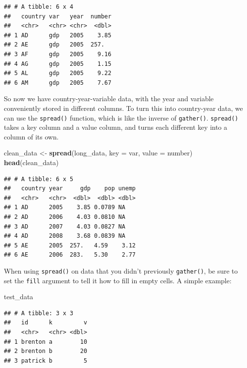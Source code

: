 \documentclass[12pt,oneside,openany]{book}
\newenvironment{Shaded}{\begin{snugshade}}{\end{snugshade}}
\newcommand{\KeywordTok}[1]{\textcolor[rgb]{0.13,0.29,0.53}{\textbf{#1}}}
\newcommand{\DataTypeTok}[1]{\textcolor[rgb]{0.13,0.29,0.53}{#1}}
\newcommand{\StringTok}[1]{\textcolor[rgb]{0.31,0.60,0.02}{#1}}
\newcommand{\NormalTok}[1]{#1}
\begin{document}
\begin{verbatim}
## # A tibble: 6 x 4
##   country var   year  number
##   <chr>   <chr> <chr>  <dbl>
## 1 AD      gdp   2005    3.85
## 2 AE      gdp   2005  257.  
## 3 AF      gdp   2005    9.16
## 4 AG      gdp   2005    1.15
## 5 AL      gdp   2005    9.22
## 6 AM      gdp   2005    7.67
\end{verbatim}

So now we have country-year-variable data, with the year and variable
conveniently stored in different columns. To turn this into country-year
data, we can use the \texttt{spread()} function, which is like the
inverse of \texttt{gather()}. \texttt{spread()} takes a key column and a
value column, and turns each different key into a column of its own.

\begin{Shaded}
\begin{Highlighting}[]
\NormalTok{clean_data <-}\StringTok{ }\KeywordTok{spread}\NormalTok{(long_data,}
                     \DataTypeTok{key =}\NormalTok{ var,}
                     \DataTypeTok{value =}\NormalTok{ number)}
\KeywordTok{head}\NormalTok{(clean_data)}
\end{Highlighting}
\end{Shaded}

\begin{verbatim}
## # A tibble: 6 x 5
##   country year     gdp    pop unemp
##   <chr>   <chr>  <dbl>  <dbl> <dbl>
## 1 AD      2005    3.85 0.0789 NA   
## 2 AD      2006    4.03 0.0810 NA   
## 3 AD      2007    4.03 0.0827 NA   
## 4 AD      2008    3.68 0.0839 NA   
## 5 AE      2005  257.   4.59    3.12
## 6 AE      2006  283.   5.30    2.77
\end{verbatim}

When using \texttt{spread()} on data that you didn't previously
\texttt{gather()}, be sure to set the \texttt{fill} argument to tell it
how to fill in empty cells. A simple example:

\begin{Shaded}
\begin{Highlighting}[]
\NormalTok{test_data}
\end{Highlighting}
\end{Shaded}

\begin{verbatim}
## # A tibble: 3 x 3
##   id      k         v
##   <chr>   <chr> <dbl>
## 1 brenton a        10
## 2 brenton b        20
## 3 patrick b         5
\end{verbatim}
\end{document}
